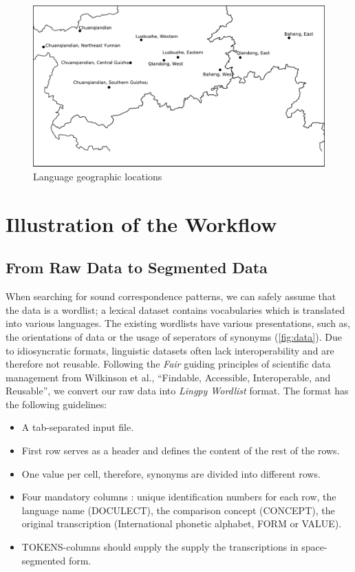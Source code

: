 \documentclass[xetex,svgnames]{scrartcl}
\begin{document}
\begin{figure}[htb]
  \centering
  \includegraphics[width=\textwidth]{Geographic.pdf}
  \caption{Language geographic locations}
  \label{fig:geo}
\end{figure}

\section{Illustration of the Workflow}\label{sec:wf}
\subsection{From Raw Data to Segmented Data}
When searching for sound correspondence patterns, we can safely assume that the data is a wordlist; a lexical dataset contains vocabularies which is translated into various languages. The existing wordlists have various presentations, such as, the orientations of data or the usage of seperators of synonyms (\ref{fig:data}). Due to idiosyncratic formats, linguistic datasets often lack interoperability and are therefore not reusable. Following the \textit{Fair} guiding principles of scientific data management from Wilkinson et al., ``Findable, Accessible, Interoperable, and Reusable''\citep{Wilkinson2016}, we convert our raw data into \textit{Lingpy Wordlist} format. 
The format has the following guidelines:

\begin{itemize}
\item A tab-separated input file. 
\item First row serves as a header and defines the content of the rest of the rows. 
\item One value per cell, therefore, synonyms are divided into different rows.
\item Four mandatory columns : unique identification numbers for each row, the language name (DOCULECT), the comparison concept (CONCEPT), the original transcription (International phonetic alphabet, FORM or VALUE). 
\item TOKENS-columns should supply the supply the transcriptions in space-segmented form.
\end{itemize}
\end{document}
